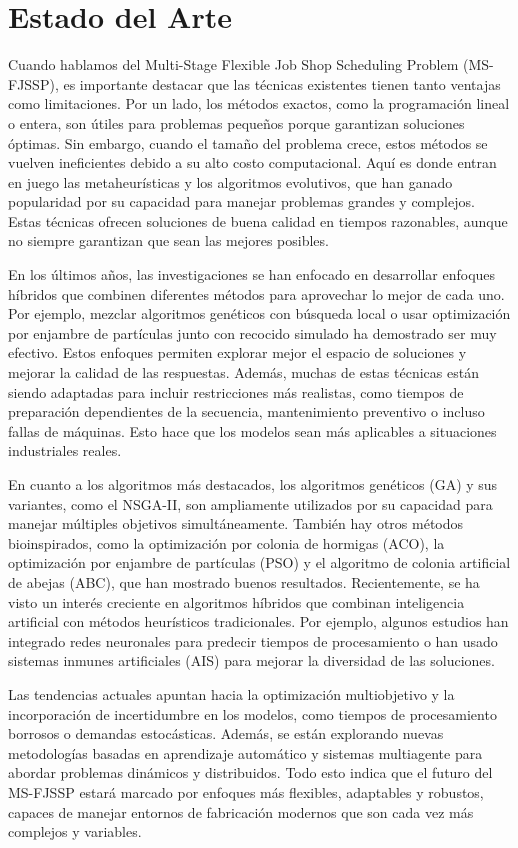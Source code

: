 \documentclass[preprint,12pt,authoryear]{elsarticle}
\begin{document}
\section{Estado del Arte}
Cuando hablamos del Multi-Stage Flexible Job Shop Scheduling Problem  (MS-FJSSP), es importante destacar que las técnicas existentes tienen tanto ventajas como limitaciones. Por un lado, los métodos exactos, como la programación lineal o entera, son útiles para problemas pequeños porque garantizan soluciones óptimas. Sin embargo, cuando el tamaño del problema crece, estos métodos se vuelven ineficientes debido a su alto costo computacional. Aquí es donde entran en juego las metaheurísticas y los algoritmos evolutivos, que han ganado popularidad por su capacidad para manejar problemas grandes y complejos. Estas técnicas ofrecen soluciones de buena calidad en tiempos razonables, aunque no siempre garantizan que sean las mejores posibles. 

En los últimos años, las investigaciones se han enfocado en desarrollar enfoques híbridos que combinen diferentes métodos para aprovechar lo mejor de cada uno. Por ejemplo, mezclar algoritmos genéticos con búsqueda local o usar optimización por enjambre de partículas junto con recocido simulado ha demostrado ser muy efectivo. Estos enfoques permiten explorar mejor el espacio de soluciones y mejorar la calidad de las respuestas. Además, muchas de estas técnicas están siendo adaptadas para incluir restricciones más realistas, como tiempos de preparación dependientes de la secuencia, mantenimiento preventivo o incluso fallas de máquinas. Esto hace que los modelos sean más aplicables a situaciones industriales reales. 

En cuanto a los algoritmos más destacados, los algoritmos genéticos (GA) y sus variantes, como el NSGA-II, son ampliamente utilizados por su capacidad para manejar múltiples objetivos simultáneamente. También hay otros métodos bioinspirados, como la optimización por colonia de hormigas (ACO), la optimización por enjambre de partículas (PSO) y el algoritmo de colonia artificial de abejas (ABC), que han mostrado buenos resultados. Recientemente, se ha visto un interés creciente en algoritmos híbridos que combinan inteligencia artificial con métodos heurísticos tradicionales. Por ejemplo, algunos estudios han integrado redes neuronales para predecir tiempos de procesamiento o han usado sistemas inmunes artificiales (AIS) para mejorar la diversidad de las soluciones. 

Las tendencias actuales apuntan hacia la optimización multiobjetivo y la incorporación de incertidumbre en los modelos, como tiempos de procesamiento borrosos o demandas estocásticas. Además, se están explorando nuevas metodologías basadas en aprendizaje automático y sistemas multiagente para abordar problemas dinámicos y distribuidos. Todo esto indica que el futuro del MS-FJSSP estará marcado por enfoques más flexibles, adaptables y robustos, capaces de manejar entornos de fabricación modernos que son cada vez más complejos y variables. 
\end{document}
